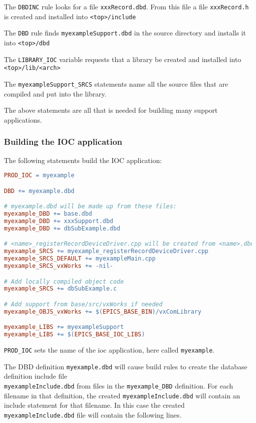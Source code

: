 The \verb|DBDINC| rule looks for a file \verb|xxxRecord.dbd|.
From this file a file \verb|xxxRecord.h| is created and installed into \verb|<top>/include|

The \verb|DBD| rule finds \verb|myexampleSupport.dbd| in the source directory and installs it into \verb|<top>/dbd|

The \verb|LIBRARY_IOC| variable requests that a library be created and installed into \verb|<top>/lib/<arch>|

The \verb|myexampleSupport_SRCS| statements name all the source files that are compiled and put into the library.

The above statements are all that is needed for building many support applications.

\subsubsection{Building the IOC application}

The following statements build the IOC application:

\begin{lstlisting}[language=make]
PROD_IOC = myexample

DBD += myexample.dbd

# myexample.dbd will be made up from these files:
myexample_DBD += base.dbd
myexample_DBD += xxxSupport.dbd
myexample_DBD += dbSubExample.dbd

# <name>_registerRecordDeviceDriver.cpp will be created from <name>.dbd
myexample_SRCS += myexample_registerRecordDeviceDriver.cpp
myexample_SRCS_DEFAULT += myexampleMain.cpp
myexample_SRCS_vxWorks += -nil-

# Add locally compiled object code
myexample_SRCS += dbSubExample.c

# Add support from base/src/vxWorks if needed
myexample_OBJS_vxWorks += $(EPICS_BASE_BIN)/vxComLibrary

myexample_LIBS += myexampleSupport
myexample_LIBS += $(EPICS_BASE_IOC_LIBS)
\end{lstlisting}

\verb|PROD_IOC| sets the name of the ioc application, here called \verb|myexample|.

The DBD definition \verb|myexample.dbd| will cause build rules to create the database definition include file \\
\verb|myexampleInclude.dbd| from files in the \verb|myexample_DBD| definition. For each filename in that
definition, the created \verb|myexampleInclude.dbd| will contain an include statement for that filename.
In this case the created \verb|myexampleInclude.dbd| file will contain the following lines.

